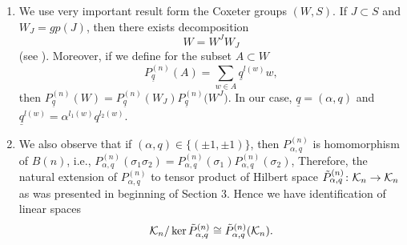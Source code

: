 \documentclass[pdftex]{sigma}
\numberwithin{equation}{section}
\def\H{{\bf \mathcal K}_{ n}}
\newcommand{\q}{q}
\newcommand{\s}{\alpha}%
\begin{document}
\begin{Remark}\label{uwagibozejko}\quad
\begin{enumerate}
\item[(1)] We use very important result form the Coxeter groups $(W,S)$. If $J\subset S$ and $W_J=gp(J)$, then there exists decomposition
\[
W=W^JW_J
\]
(see \cite{Humphreys}). Moreover, if we define for the subset $A\subset W$
\[
P_{\underline q}^{(n)}(A)=\sum_{w\in A}{\underline q}^{l(w)}w,
\]
then $P_{\underline q}^{(n)}(W)=P_{\underline q}^{(n)}(W_J)P_{\underline q}^{(n)}\big(W^J\big)$.
In our case, $\underline q=(\s,\q)$ and ${\underline q}^{l(w)}={\alpha}^{l_1(w)}{ \q}^{l_2(w)}$.

\item[(2)] We also observe that if $(\s,\q)\in\{(\pm 1,\pm 1)\}$, then $P_{\s,\q}^{(n)}$ is homomorphism of $B(n)$, i.e., $P_{\s,\q}^{(n)}(\sigma_1\sigma_2)=P_{\s,\q}^{(n)}(\sigma_1)P_{\s,\q}^{(n)}(\sigma_2)$, Therefore, the natural extension of $P_{\s,\q}^{(n)}$ to tensor product of Hilbert space $\tilde P_{\s,\q}^{(n)}\colon \H \to \H $ as was presented in beginning of Section 3. Hence we have identification of linear spaces
\[
\H/ \ker \tilde P_{\s,\q}^{(n)}\cong \tilde P_{\s,\q}^{(n)}(\H ).
\]


\end{enumerate}
\end{Remark}
\end{document}
